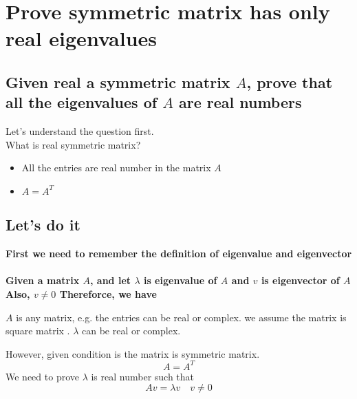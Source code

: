 \documentclass{article}
\begin{document}
\section{Prove symmetric matrix has only real eigenvalues}
\subsection{Given real a symmetric matrix $A$, prove that all the eigenvalues of $A$ are real numbers}

Let's understand the question first. \\

What is real symmetric matrix?

\begin{itemize}
\item All the entries are real number in the matrix $A$ 
\item $A = A^{T}$ 
\end{itemize}

\subsection{Let's do it}
\large

\textbf{
First we need to remember the definition of eigenvalue and eigenvector \\ \\
Given a matrix $A$, and let $\lambda$ is eigenvalue of $A$ and $v$ is eigenvector of $A$
Also, $v \neq 0 $ 
Thereforce, we have  
}

$A$ is any matrix, e.g. the entries can be real or complex.
we assume the matrix is square matrix .
$\lambda$ can be real or complex.

However, given condition is the matrix is symmetric matrix.
            \[ A = A^{T} \]
We need to prove $\lambda$ is real number such that 
            \[ A v = \lambda v \quad v \neq 0 \]

    




\end{document}
